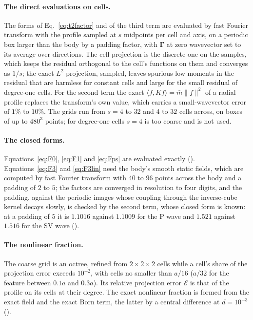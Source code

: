 \documentclass[11pt,a4paper]{article}
\newcommand{\cE}{\mathcal{E}}
\begin{document}
\paragraph{The direct evaluations on cells.} The forms of Eq.~\eqref{eq:t2factor} and of the third term
are evaluated by fast Fourier transform with the profile sampled at $s$ midpoints per cell and axis, on
a periodic box larger than the body by a padding factor, with $\boldsymbol\Gamma$ at zero wavevector set
to its average over directions. The cell projection is the discrete one on the samples, which keeps the
residual orthogonal to the cell's functions on them and converges as $1/s$; the exact $L^2$ projection,
sampled, leaves spurious low moments in the residual that are harmless for constant cells and large for
the small residual of degree-one cells. For the second term the exact $\langle f,Kf\rangle=\bar m\lVert
f\rVert^2$ of a radial profile replaces the transform's own value, which carries a small-wavevector error
of $1\%$ to $10\%$. The grids run from $s=4$ to $32$ and $4$ to $32$ cells across, on boxes of up to
$480^3$ points; for degree-one cells $s=4$ is too coarse and is not used.

{\sloppy\paragraph{The closed forms.} Equations~\eqref{eq:F0}, \eqref{eq:F1} and \eqref{eq:Fps} are evaluated
exactly (). Equations~\eqref{eq:F3} and \eqref{eq:F3lin}
need the body's smooth static fields, which are computed by fast Fourier transform with $40$ to $96$
points across the body and a padding of $2$ to $5$; the factors are converged in resolution to four
digits, and the padding, against the periodic images whose coupling through the inverse-cube kernel
decays slowly, is checked by the second term, whose closed form is known: at a padding of $5$ it is
$1.1016$ against $1.1009$ for the P wave and $1.521$ against $1.516$ for the SV wave
().\par}

\paragraph{The nonlinear fraction.} The coarse grid is an octree, refined from $2\times2\times2$ cells
while a cell's share of the projection error exceeds $10^{-2}$, with cells no smaller than $a/16$ ($a/32$
for the feature between $0.1a$ and $0.3a$). Its relative projection error $\cE$ is that of the profile on
its cells at their degree. The exact nonlinear fraction is formed from the exact field and the exact Born
term, the latter by a central difference at $d=10^{-3}$ ().
\end{document}
